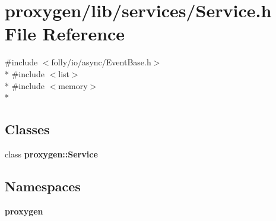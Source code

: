 \section{proxygen/lib/services/\+Service.h File Reference}
\label{Service_8h}
{\ttfamily \#include $<$folly/io/async/\+Event\+Base.\+h$>$}\\*
{\ttfamily \#include $<$list$>$}\\*
{\ttfamily \#include $<$memory$>$}\\*
\subsection*{Classes}
\begin{DoxyCompactItemize}
\item 
class {\bf proxygen\+::\+Service}
\end{DoxyCompactItemize}
\subsection*{Namespaces}
\begin{DoxyCompactItemize}
\item 
 {\bf proxygen}
\end{DoxyCompactItemize}
